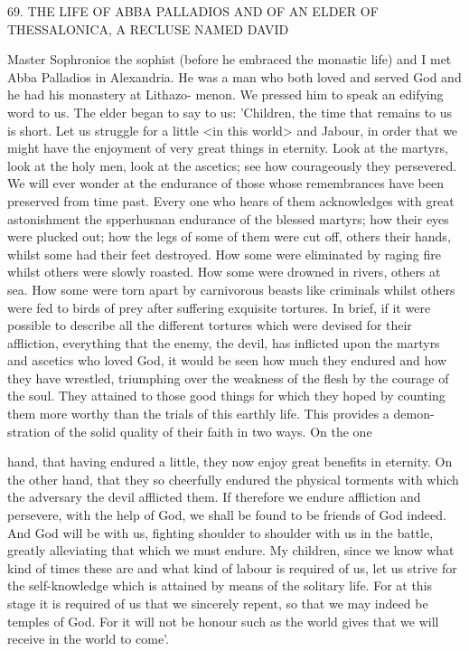 69. THE LIFE OF ABBA PALLADIOS AND OF AN
ELDER OF THESSALONICA,
A RECLUSE NAMED DAVID

Master Sophronios the sophist (before he embraced the monastic
life) and I met Abba Palladios in Alexandria. He was a man who
both loved and served God and he had his monastery at Lithazo-
menon. We pressed him to speak an edifying word to us. The elder
began to say to us: 'Children, the time that remains to us is short.
Let us struggle for a little <in this world> and Jabour, in order that
we might have the enjoyment of very great things in eternity. Look
at the martyrs, look at the holy men, look at the ascetics; see how
courageously they persevered. We will ever wonder at the endurance
of those whose remembrances have been preserved from time past.
Every one who hears of them acknowledges with great astonishment
the spperhusnan endurance of the blessed martyrs; how their eyes
were plucked out; how the legs of some of them were cut off, others
their hands, whilst some had their feet destroyed. How some were
eliminated by raging fire whilst others were slowly roasted. How
some were drowned in rivers, others at sea. How some were torn
apart by carnivorous beasts like criminals whilst others were fed to
birds of prey after suffering exquisite tortures. In brief, if it were
possible to describe all the different tortures which were devised for
their affliction, everything that the enemy, the devil, has inflicted
upon the martyrs and ascetics who loved God, it would be seen how
much they endured and how they have wrestled, triumphing over
the weakness of the flesh by the courage of the soul. They attained
to those good things for which they hoped by counting them more
worthy than the trials of this earthly life. This provides a demon-
stration of the solid quality of their faith in two ways. On the one

hand, that having endured a little, they now enjoy great benefits in
eternity. On the other hand, that they so cheerfully endured the
physical torments with which the adversary the devil afflicted them.
If therefore we endure affliction and persevere, with the help of
God, we shall be found to be friends of God indeed. And God will
be with us, fighting shoulder to shoulder with us in the battle,
greatly alleviating that which we must endure. My children, since we
know what kind of times these are and what kind of labour is
required of us, let us strive for the self-knowledge which is attained
by means of the solitary life. For at this stage it is required of us
that we sincerely repent, so that we may indeed be temples of God.
For it will not be honour such as the world gives that we will
receive in the world to come'.

